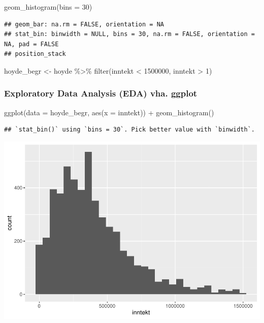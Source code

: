 \documentclass[
  12pt,
  norsk,
]{article}
\newenvironment{Shaded}{\begin{snugshade}}{\end{snugshade}}
\newcommand{\AttributeTok}[1]{\textcolor[rgb]{0.77,0.63,0.00}{#1}}
\newcommand{\DecValTok}[1]{\textcolor[rgb]{0.00,0.00,0.81}{#1}}
\newcommand{\FunctionTok}[1]{\textcolor[rgb]{0.00,0.00,0.00}{#1}}
\newcommand{\NormalTok}[1]{#1}
\newcommand{\OtherTok}[1]{\textcolor[rgb]{0.56,0.35,0.01}{#1}}
\newcommand{\SpecialCharTok}[1]{\textcolor[rgb]{0.00,0.00,0.00}{#1}}
\begin{document}
\begin{Shaded}
\begin{Highlighting}[]
  \FunctionTok{geom\_histogram}\NormalTok{(}\AttributeTok{bins =} \DecValTok{30}\NormalTok{)}
\end{Highlighting}
\end{Shaded}

\begin{verbatim}
## geom_bar: na.rm = FALSE, orientation = NA
## stat_bin: binwidth = NULL, bins = 30, na.rm = FALSE, orientation = NA, pad = FALSE
## position_stack
\end{verbatim}

\begin{Shaded}
\begin{Highlighting}[]
\NormalTok{hoyde\_begr }\OtherTok{\textless{}{-}}\NormalTok{ hoyde }\SpecialCharTok{\%\textgreater{}\%} 
  \FunctionTok{filter}\NormalTok{(inntekt }\SpecialCharTok{\textless{}} \DecValTok{1500000}\NormalTok{,}
\NormalTok{         inntekt }\SpecialCharTok{\textgreater{}} \DecValTok{1}\NormalTok{)}
\end{Highlighting}
\end{Shaded}

\hypertarget{exploratory-data-analysis-eda-vha.-ggplot}{%
\subsubsection{Exploratory Data Analysis (EDA) vha.
ggplot}\label{exploratory-data-analysis-eda-vha.-ggplot}}

\begin{Shaded}
\begin{Highlighting}[]
\FunctionTok{ggplot}\NormalTok{(}\AttributeTok{data =}\NormalTok{ hoyde\_begr, }\FunctionTok{aes}\NormalTok{(}\AttributeTok{x =}\NormalTok{ inntekt)) }\SpecialCharTok{+} 
  \FunctionTok{geom\_histogram}\NormalTok{()}
\end{Highlighting}
\end{Shaded}

\begin{verbatim}
## `stat_bin()` using `bins = 30`. Pick better value with `binwidth`.
\end{verbatim}

\includegraphics{arbeidskrav2_files/figure-latex/unnamed-chunk-6-1.pdf}
\end{document}
